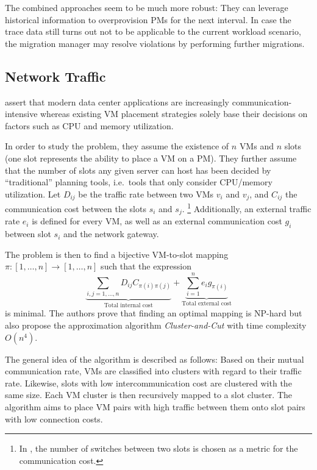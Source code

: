 \documentclass[12pt, a4paper]{scrartcl}
\begin{document}
The combined approaches seem to be much more robust:
They can leverage historical information to overprovision \acp{PM} for the next interval.
In case the trace data still turns out not to be applicable to the current workload scenario, the migration manager may resolve violations by performing further migrations.

\subsection{Network Traffic}
\textcite{meng_traffic_aware_2010} assert that modern data center applications are increasingly communication-intensive whereas existing \ac{VM} placement strategies solely base their decisions on factors such as CPU and memory utilization.

In order to study the problem, they assume the existence of \(n\) \acp{VM} and \(n\) slots (one slot represents the ability to place a \ac{VM} on a \ac{PM}).
They further assume that the number of slots any given server can host has been decided by \enquote{traditional} planning tools, i.e.\ tools that only consider CPU/memory utilization.
Let \(D_{ij}\) be the traffic rate between two \acp{VM} \(v_i\) and \(v_j\), and \(C_{ij}\) the communication cost between the slots \(s_i\) and \(s_j\).
\footnote{In \cite{meng_traffic_aware_2010}, the number of switches between two slots is chosen as a metric for the communication cost.}
Additionally, an external traffic rate \(e_i\) is defined for every \ac{VM}, as well as an external communication cost \(g_i\) between slot \(s_i\) and the network gateway.

The problem is then to find a bijective VM-to-slot mapping \(\pi \colon [1, \dots, n] \to [1, \dots, n]\) such that the expression
\[
    \underbrace{\sum_{i, j = 1, \dots, n} D_{ij} C_{\pi(i) \pi(j)}}_\text{Total internal cost}
    + \underbrace{\sum_{i = 1}^{n} e_i g_{\pi(i)}}_\text{Total external cost}
\]
is minimal.
The authors prove that finding an optimal mapping is NP-hard but also propose the approximation algorithm \emph{Cluster-and-Cut} with time complexity \(O(n^4)\).

The general idea of the algorithm is described as follows:
Based on their mutual communication rate, \acp{VM} are classified into clusters with regard to their traffic rate.
Likewise, slots with low intercommunication cost are clustered with the same size.
Each \ac{VM} cluster is then recursively mapped to a slot cluster.
The algorithm aims to place \ac{VM} pairs with high traffic between them onto slot pairs with low connection costs.
\end{document}
